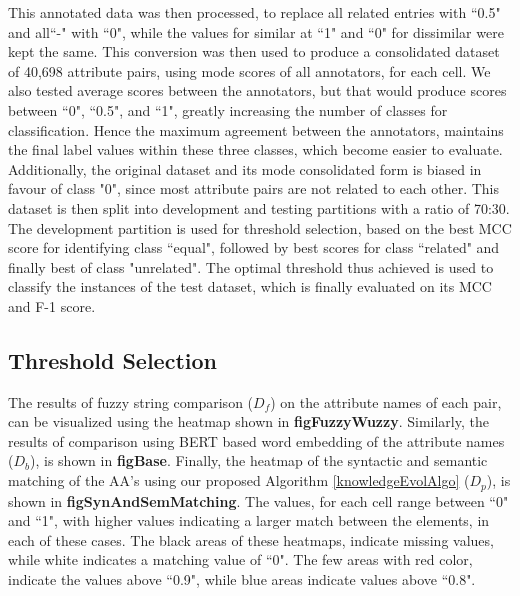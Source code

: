 This annotated data was then processed, to replace all related entries with ``0.5" and all``-" with ``0", while the values for similar at ``1" and ``0" for dissimilar were kept the same. This conversion was then used to produce a consolidated dataset of 40,698 attribute pairs, using mode scores of all annotators, for each cell. We also tested average scores between the annotators, but that would produce scores between ``0", ``0.5", and ``1", greatly increasing the number of classes for classification. Hence the maximum agreement between the annotators, maintains the final label values within these three classes, which become easier to evaluate. Additionally, the original dataset and its mode consolidated form is biased in favour of class "0", since most attribute pairs are not related to each other.
This dataset is then split into development and testing partitions with a ratio of 70:30. The development partition is used for threshold selection, based on the best MCC score for identifying class ``equal", followed by best scores for class ``related" and finally best of class "unrelated". The optimal threshold thus achieved is used to classify the instances of the test dataset, which is finally evaluated on its MCC and F-1 score.
\subsection*{Threshold Selection}





The results of fuzzy string comparison ($D_f$) on the attribute names of each pair, can be visualized using the heatmap shown in \textbf{figFuzzyWuzzy}. Similarly, the results of comparison using BERT based word embedding of the attribute names ($D_b$), is shown in \textbf{figBase}. Finally, the heatmap of the syntactic and semantic matching of the AA's using our proposed Algorithm \ref{knowledgeEvolAlgo} ($D_p$), is shown in \textbf{figSynAndSemMatching}. The values, for each cell range between ``0" and ``1", with higher values indicating a larger match between the elements, in each of these cases. The black areas of these heatmaps, indicate missing values, while white indicates a matching value of ``0". The few areas with red color, indicate the values above ``0.9", while blue areas indicate values above ``0.8". 


